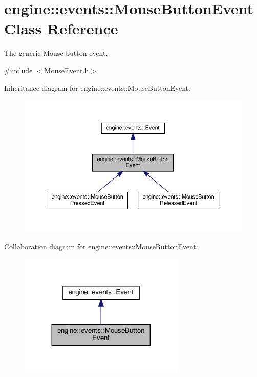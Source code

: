 \hypertarget{classengine_1_1events_1_1MouseButtonEvent}{}\section{engine\+:\+:events\+:\+:Mouse\+Button\+Event Class Reference}
\label{classengine_1_1events_1_1MouseButtonEvent}


The generic Mouse button event.  




{\ttfamily \#include $<$Mouse\+Event.\+h$>$}



Inheritance diagram for engine\+:\+:events\+:\+:Mouse\+Button\+Event\+:\nopagebreak
\begin{figure}[H]
\begin{center}
\leavevmode
\includegraphics[width=350pt]{classengine_1_1events_1_1MouseButtonEvent__inherit__graph}
\end{center}
\end{figure}


Collaboration diagram for engine\+:\+:events\+:\+:Mouse\+Button\+Event\+:\nopagebreak
\begin{figure}[H]
\begin{center}
\leavevmode
\includegraphics[width=224pt]{classengine_1_1events_1_1MouseButtonEvent__coll__graph}
\end{center}
\end{figure}

